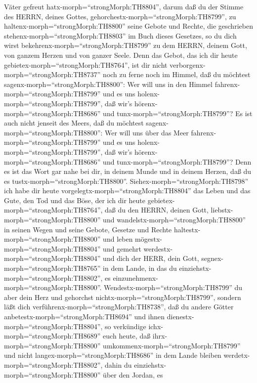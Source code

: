 Väter gefreut hatx-morph=``strongMorph:TH8804'',  darum daß
du der Stimme des HERRN, deines Gottes,
gehorchestx-morph=``strongMorph:TH8799'', zu
haltenx-morph=``strongMorph:TH8800'' seine Gebote und Rechte, die
geschrieben stehenx-morph=``strongMorph:TH8803'' im Buch dieses
Gesetzes, so du dich wirst bekehrenx-morph=``strongMorph:TH8799'' zu dem
HERRN, deinem Gott, von ganzem Herzen und von ganzer Seele.
 Denn das Gebot, das ich dir heute
gebietex-morph=``strongMorph:TH8764'', ist dir nicht
verborgenx-morph=``strongMorph:TH8737'' noch zu ferne  noch
im Himmel, daß du möchtest sagenx-morph=``strongMorph:TH8800'': Wer will
uns in den Himmel fahrenx-morph=``strongMorph:TH8799'' und es uns
holenx-morph=``strongMorph:TH8799'', daß wir's
hörenx-morph=``strongMorph:TH8686'' und
tunx-morph=``strongMorph:TH8799''?  Es ist auch nicht
jenseit des Meers, daß du möchtest sagenx-morph=``strongMorph:TH8800'':
Wer will uns über das Meer fahrenx-morph=``strongMorph:TH8799'' und es
uns holenx-morph=``strongMorph:TH8799'', daß wir's
hörenx-morph=``strongMorph:TH8686'' und
tunx-morph=``strongMorph:TH8799''?  Denn es ist das Wort
gar nahe bei dir, in deinem Munde und in deinem Herzen, daß du es
tustx-morph=``strongMorph:TH8800''. 
Siehex-morph=``strongMorph:TH8798'' ich habe dir heute
vorgelegtx-morph=``strongMorph:TH8804'' das Leben und das Gute, den Tod
und das Böse,  der ich dir heute
gebietex-morph=``strongMorph:TH8764'', daß du den HERRN, deinen Gott,
liebstx-morph=``strongMorph:TH8800'' und
wandelstx-morph=``strongMorph:TH8800'' in seinen Wegen und seine Gebote,
Gesetze und Rechte haltestx-morph=``strongMorph:TH8800'' und leben
mögestx-morph=``strongMorph:TH8804'' und gemehrt
werdestx-morph=``strongMorph:TH8804'' und dich der HERR, dein Gott,
segnex-morph=``strongMorph:TH8765'' in dem Lande, in das du
einziehstx-morph=``strongMorph:TH8802'', es
einzunehmenx-morph=``strongMorph:TH8800''. 
Wendestx-morph=``strongMorph:TH8799'' du aber dein Herz und gehorchst
nichtx-morph=``strongMorph:TH8799'', sondern läßt dich
verführenx-morph=``strongMorph:TH8738'', daß du andere Götter
anbetestx-morph=``strongMorph:TH8694'' und ihnen
dienestx-morph=``strongMorph:TH8804'',  so verkündige
ichx-morph=``strongMorph:TH8689'' euch heute, daß
ihrx-morph=``strongMorph:TH8800'' umkommenx-morph=``strongMorph:TH8799''
und nicht langex-morph=``strongMorph:TH8686'' in dem Lande bleiben
werdetx-morph=``strongMorph:TH8802'', dahin du
einziehstx-morph=``strongMorph:TH8800'' über den Jordan, es
